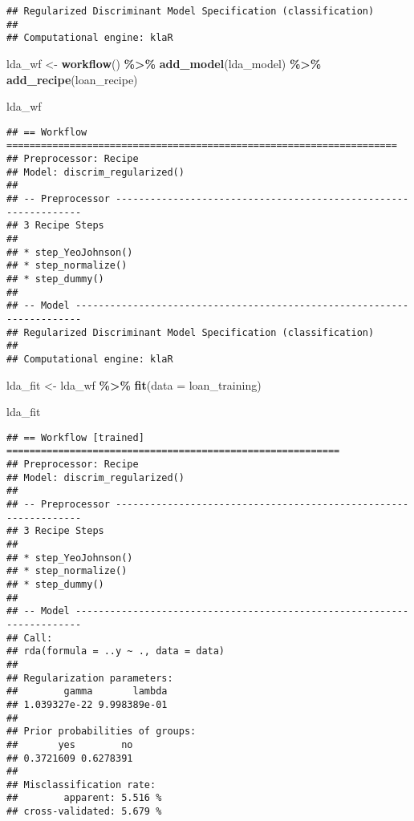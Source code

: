 \documentclass[
]{article}
\newenvironment{Shaded}{\begin{snugshade}}{\end{snugshade}}
\newcommand{\AttributeTok}[1]{\textcolor[rgb]{0.13,0.29,0.53}{#1}}
\newcommand{\FunctionTok}[1]{\textcolor[rgb]{0.13,0.29,0.53}{\textbf{#1}}}
\newcommand{\NormalTok}[1]{#1}
\newcommand{\OtherTok}[1]{\textcolor[rgb]{0.56,0.35,0.01}{#1}}
\newcommand{\SpecialCharTok}[1]{\textcolor[rgb]{0.81,0.36,0.00}{\textbf{#1}}}
\begin{document}
\begin{verbatim}
## Regularized Discriminant Model Specification (classification)
## 
## Computational engine: klaR
\end{verbatim}

\begin{Shaded}
\begin{Highlighting}[]
\NormalTok{lda\_wf }\OtherTok{\textless{}{-}} \FunctionTok{workflow}\NormalTok{() }\SpecialCharTok{\%\textgreater{}\%} 
  \FunctionTok{add\_model}\NormalTok{(lda\_model) }\SpecialCharTok{\%\textgreater{}\%} 
  \FunctionTok{add\_recipe}\NormalTok{(loan\_recipe)}

\NormalTok{lda\_wf}
\end{Highlighting}
\end{Shaded}

\begin{verbatim}
## == Workflow ====================================================================
## Preprocessor: Recipe
## Model: discrim_regularized()
## 
## -- Preprocessor ----------------------------------------------------------------
## 3 Recipe Steps
## 
## * step_YeoJohnson()
## * step_normalize()
## * step_dummy()
## 
## -- Model -----------------------------------------------------------------------
## Regularized Discriminant Model Specification (classification)
## 
## Computational engine: klaR
\end{verbatim}

\begin{Shaded}
\begin{Highlighting}[]
\NormalTok{lda\_fit }\OtherTok{\textless{}{-}}\NormalTok{ lda\_wf }\SpecialCharTok{\%\textgreater{}\%} 
                 \FunctionTok{fit}\NormalTok{(}\AttributeTok{data =}\NormalTok{ loan\_training)}

\NormalTok{lda\_fit}
\end{Highlighting}
\end{Shaded}

\begin{verbatim}
## == Workflow [trained] ==========================================================
## Preprocessor: Recipe
## Model: discrim_regularized()
## 
## -- Preprocessor ----------------------------------------------------------------
## 3 Recipe Steps
## 
## * step_YeoJohnson()
## * step_normalize()
## * step_dummy()
## 
## -- Model -----------------------------------------------------------------------
## Call: 
## rda(formula = ..y ~ ., data = data)
## 
## Regularization parameters: 
##        gamma       lambda 
## 1.039327e-22 9.998389e-01 
## 
## Prior probabilities of groups: 
##       yes        no 
## 0.3721609 0.6278391 
## 
## Misclassification rate: 
##        apparent: 5.516 %
## cross-validated: 5.679 %
\end{verbatim}
\end{document}
